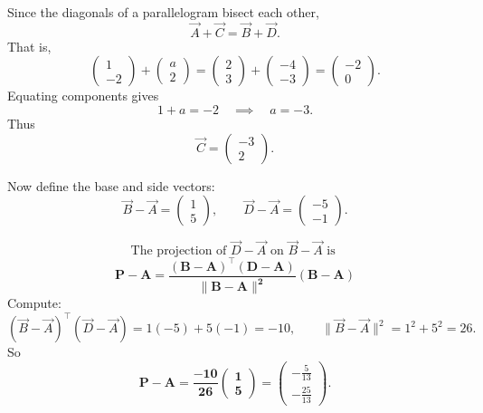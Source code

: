 \documentclass[journal]{IEEEtran}
\begin{document}
Since the diagonals of a parallelogram bisect each other,
\begin{equation}
\vec A+\vec C = \vec B+\vec D.
\end{equation}
That is,
\begin{equation}
\begin{pmatrix}1\\-2\end{pmatrix}+\begin{pmatrix}a\\2\end{pmatrix}
=\begin{pmatrix}2\\3\end{pmatrix}+\begin{pmatrix}-4\\-3\end{pmatrix}
=\begin{pmatrix}-2\\0\end{pmatrix}.
\end{equation}
Equating components gives
\begin{equation}
1+a=-2 \quad \implies \quad a=-3.
\end{equation}
Thus
\begin{equation}
\vec C=\begin{pmatrix}-3\\2\end{pmatrix}.
\end{equation}

Now define the base and side vectors:
\begin{equation}
\vec B-\vec A=\begin{pmatrix}1\\5\end{pmatrix}, \qquad
\vec D-\vec A=\begin{pmatrix}-5\\-1\end{pmatrix}.
\end{equation}

\[
\text{The projection of }\vec{D}-\vec{A}\text{ on }\vec{B}-\vec{A}\text{ is } 
\]
\begin{equation}
\mathbf{P-A = \frac{(B-A)^\top (D-A)}{\|B-A\|^2} (B-A)}
\end{equation}
Compute:
\begin{equation}
(\vec B-\vec A)^\top(\vec D-\vec A)=1(-5)+5(-1)=-10, \qquad
\|\vec B-\vec A\|^2=1^2+5^2=26.
\end{equation}
So
\begin{equation}
\mathbf{P-A=\frac{-10}{26}\begin{pmatrix}1\\5\end{pmatrix}}
=\begin{pmatrix}-\tfrac{5}{13}\\[4pt]-\tfrac{25}{13}\end{pmatrix}.
\end{equation}
\end{document}
